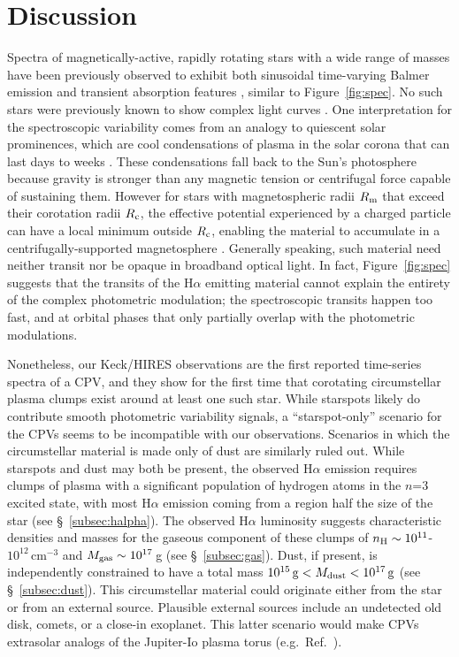 \documentclass{nature3}
\begin{document}
\section{Discussion}

Spectra of magnetically-active, rapidly rotating stars with a wide
range of masses have been previously observed to exhibit both
sinusoidal time-varying Balmer emission
\cite{Donati2000,Townsend2005,Dunstone2006,Skelly2008} and transient
absorption features
\cite{CollierCameron1989,CollierCameron1992,Cang2020}, similar to
Figure~\ref{fig:spec}.  No such stars were previously known to show
complex light curves \cite{Bouma2024}.   One interpretation for the
spectroscopic variability comes from an analogy to quiescent
solar prominences, which are cool condensations of plasma in the solar
corona that can last days to weeks \cite{VialEngvold2015}.  These
condensations fall back to the Sun's photosphere because gravity is
stronger than any magnetic tension or centrifugal force capable of
sustaining them.  However for stars with magnetospheric radii $R_{\rm
m}$ that exceed their corotation radii $R_{\rm c}$, the effective
potential experienced by a charged particle can have a local minimum
outside $R_{\rm c}$, enabling the material to accumulate in a
centrifugally-supported magnetosphere
\cite{Petit2013,Daley-Yates2024}.  Generally speaking, such material
need neither transit nor be opaque in broadband optical light.  In
fact, Figure~\ref{fig:spec} suggests that the transits of the
H$\alpha$ emitting material cannot explain the entirety of the complex
photometric modulation;  the spectroscopic transits happen too fast, and
at orbital phases that only partially overlap with the photometric
modulations.

Nonetheless, our Keck/HIRES observations are the first reported
time-series spectra of a CPV, and they show for the first time that
corotating circumstellar plasma clumps exist around at least one such
star.  While starspots likely do contribute smooth photometric
variability signals, a ``starspot-only'' scenario for the CPVs
\cite{Koen2021} seems to be incompatible with our observations.
Scenarios in which the circumstellar material is made only of dust are
similarly ruled out.  While starspots and dust may both be present,
the observed H$\alpha$ emission requires clumps of plasma with a
significant population of hydrogen atoms in the $n$=3 excited state,
with most H$\alpha$ emission coming from a region half the size of the
star (see \S~\ref{subsec:halpha}).  The observed H$\alpha$ luminosity
suggests
characteristic densities and masses for the gaseous component of these
clumps of $n_{\rm H} \sim 10^{11}$-$10^{12}$\,cm$^{-3}$ and $M_{\rm
gas} \sim 10^{17}$\,g (see \S~\ref{subsec:gas}).  Dust, if present, is
independently constrained to have a total mass $10^{15}\,{\rm g} <
M_{\rm dust} < 10^{17}\,{\rm g}$ (see \S~\ref{subsec:dust}).  This
circumstellar material could originate either from the star or from an
external source.  Plausible external sources include an undetected old
disk, comets, or a close-in exoplanet.  This latter scenario would
make CPVs extrasolar analogs of the Jupiter-Io plasma torus
(e.g.~Ref.~\cite{Bagenal1981}).
\end{document}
